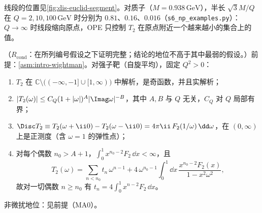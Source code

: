 线段的位置见\cref{fig:dis-euclid-segment}。对质子（$M=0.938\,\mathrm{GeV}$），半长 $\sqrt3M/Q$ 在 $Q=2,10,100\,\mathrm{GeV}$ 时分别为 $0.81$、$0.16$、$0.016$（\texttt{s6\_np\_examples.py}）：$Q\to\infty$ 时线段缩向原点，OPE 只控制 $T_2$ 在原点附近一个越来越小的集合上的值。


\begin{proposition}\label{prop:dis-dispersion-np}
（$R_{\mathrm{cond}}$：在所列编号假设之下证明完整；结论的地位不高于其中最弱的假设。）前提：\cref{asm:intro-wightman}。对强子靶（自旋平均），固定 $Q^2>0$：
\begin{enumerate}[label=(\alph*),leftmargin=2.2em,itemsep=0pt,topsep=2pt]
\item $T_2$ 在 $\mathbb C\setminus\big((-\infty,-1]\cup[1,\infty)\big)$ 中解析，是奇函数，并且实解析；
\item $|T_2(\omega)|\le C_Q(1+|\omega|)^A|\Imag\omega|^{-B}$，其中 $A,B$ 与 $Q$ 无关，$C_Q$ 对 $Q$ 局部有界；
\item $\Disc T_2\equiv T_2(\omega+\ii0)-T_2(\omega-\ii0)=4\pi\ii\,F_2(1/\omega)\,\dd\omega$，在 $(0,\infty)$ 上是正测度（含 $\omega=1$ 的弹性点）；
\item 对每个偶数 $n_0>A+1$，$\int_0^1x^{n_0-2}F_2\,\dd x<\infty$，且
\begin{equation}\label{eq:dis-dispersion-np}
T_2(\omega)=\sum_{n<n_0}t_n\,\omega^{n-1}+4\,\omega^{n_0-1}\int_0^1\dd x\,\frac{x^{n_0-2}F_2(x)}{1-x^2\omega^2},
\end{equation}
故对一切偶数 $n\ge n_0$ 有 $t_n=4\int_0^1x^{n-2}F_2\,\dd x$。%
\end{enumerate}
非微扰地位：见前提（MA0）。
\end{proposition}

